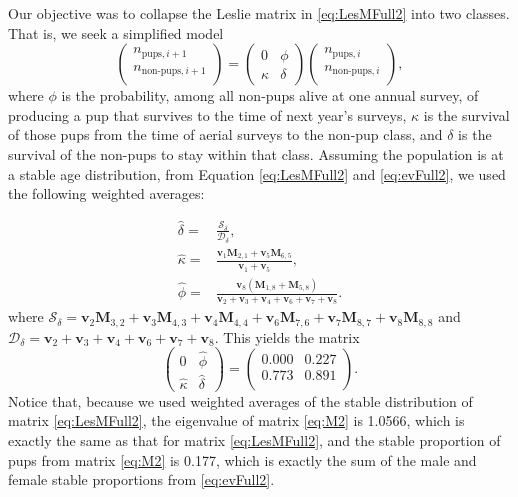 \documentclass[]{risa}\usepackage[]{graphicx}\usepackage[]{color}
\def\bv{\mathbf{v}}
\def\bM{\mathbf{M}}
\begin{document}
Our objective was to collapse the Leslie matrix in \ref{eq:LesMFull2} into two classes. That is, we seek a simplified model
\[
  \left(\begin{array}{c}
    n_{\textrm{pups},i+1} \\
    n_{\textrm{non-pups},i+1} \\
  \end{array}\right) =
    \left( \begin{array}{ll}
      0 & \phi \\
      \kappa & \delta
  \end{array} \right)
    \left(\begin{array}{c}
    n_{\textrm{pups},i} \\
    n_{\textrm{non-pups},i} \\
  \end{array}\right),
\]
where $\phi$ is the probability, among all non-pups alive at one annual survey, of producing a pup that survives to the time of next year's surveys, $\kappa$ is the survival of those pups from the time of aerial surveys to the non-pup class, and $\delta$
is the survival of the non-pups to stay within that class. Assuming the population is at a stable age distribution, from Equation \ref{eq:LesMFull2} and \ref{eq:evFull2}, we used the following weighted averages:


 
\begin{align} \label{eq:delphikap}
  \hat{\delta} = & \frac{ \mathcal{S}_\delta }{\mathcal{D}_\delta}, \nonumber \\
  \hat{\kappa} = & \frac{ \bv_1\bM_{2,1} + \bv_5\bM_{6,5} } { \bv_1 + \bv_5 }, \nonumber \\
  \hat{\phi} = & \frac{\bv_8(\bM_{1,8} + \bM_{5,8})}{\bv_2 + \bv_3 + \bv_4 + \bv_6 + \bv_7 + \bv_8}.
\end{align}
where $\mathcal{S}_\delta = \bv_2\bM_{3,2}+\bv_3\bM_{4,3}+\bv_4\bM_{4,4}+\bv_6\bM_{7,6}+\bv_7\bM_{8,7}+\bv_8\bM_{8,8}$ and $\mathcal{D}_\delta = \bv_2 + \bv_3 + \bv_4 + \bv_6 + \bv_7 + \bv_8$. This yields the matrix
\begin{equation}\label{eq:M2}
  \left( \begin{array}{ll}
      0 & \hat{\phi} \\
      \hat{\kappa} & \hat{\delta}
  \end{array} \right) = 
  \left( \begin{array}{ll}
 0.000 & 0.227 \\ 
  0.773 & 0.891 \\ 
  \end{array} \right).
\end{equation}
Notice that, because we used weighted averages of the stable distribution of matrix \ref{eq:LesMFull2}, the eigenvalue of matrix \ref{eq:M2} is 1.0566, which is exactly the same as that for matrix \ref{eq:LesMFull2}, and the stable proportion of pups from matrix \ref{eq:M2} is 0.177, which is exactly the sum of the male and female stable proportions from \ref{eq:evFull2}.
\end{document}
